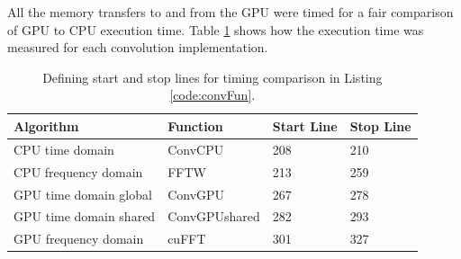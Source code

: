 %
%
%
%

All the memory transfers to and from the GPU were timed for a fair comparison of GPU to CPU execution time.
Table \ref{tab:CPUvsGPUtimingTable} shows how the execution time was measured for each convolution implementation.
\begin{table}
\caption{Defining start and stop lines for timing comparison in Listing \ref{code:convFun}.}
\begin{center}
\begin{tabular}{llll}
	\toprule
	Algorithm 				& Function		& Start Line	& Stop  Line		\\ \midrule
	CPU time domain 		& ConvCPU 		& 208			& 210 				\\
	CPU frequency domain 	& FFTW 			& 213			& 259 				\\
	GPU time domain global 	& ConvGPU 		& 267			& 278				\\
	GPU time domain shared 	& ConvGPUshared & 282			& 293				\\
	GPU frequency domain 	& cuFFT			& 301			& 327				\\ 
	\bottomrule
\end{tabular}
\end{center}
\label{tab:CPUvsGPUtimingTable}
\end{table}

